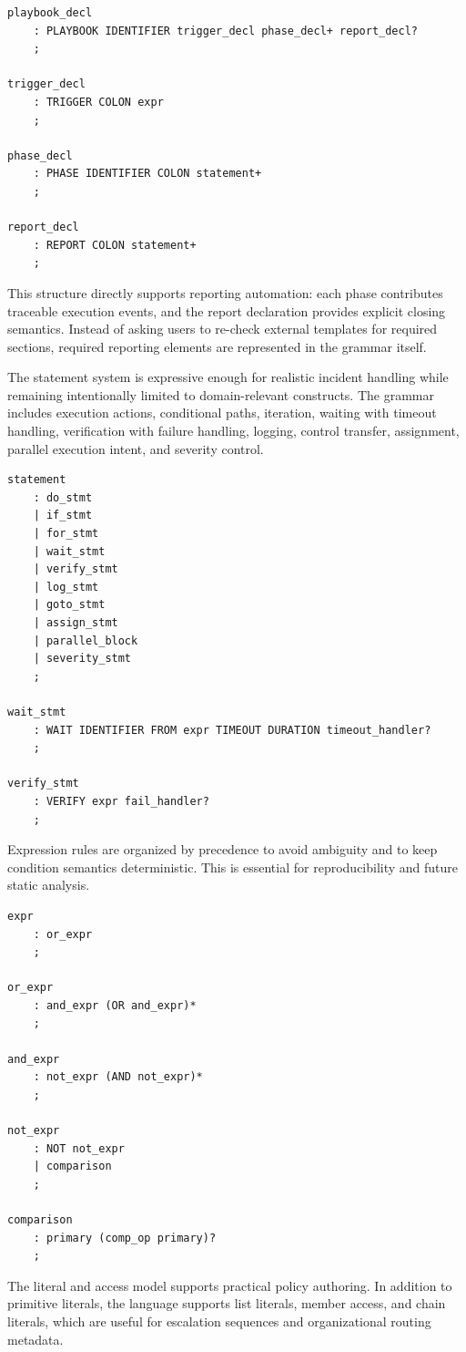 \begin{lstlisting}
playbook_decl
    : PLAYBOOK IDENTIFIER trigger_decl phase_decl+ report_decl?
    ;

trigger_decl
    : TRIGGER COLON expr
    ;

phase_decl
    : PHASE IDENTIFIER COLON statement+
    ;

report_decl
    : REPORT COLON statement+
    ;
\end{lstlisting}

This structure directly supports reporting automation: each phase contributes traceable execution events, and the report declaration provides explicit closing semantics. Instead of asking users to re-check external templates for required sections, required reporting elements are represented in the grammar itself.

The statement system is expressive enough for realistic incident handling while remaining intentionally limited to domain-relevant constructs. The grammar includes execution actions, conditional paths, iteration, waiting with timeout handling, verification with failure handling, logging, control transfer, assignment, parallel execution intent, and severity control.

\begin{lstlisting}
statement
    : do_stmt
    | if_stmt
    | for_stmt
    | wait_stmt
    | verify_stmt
    | log_stmt
    | goto_stmt
    | assign_stmt
    | parallel_block
    | severity_stmt
    ;

wait_stmt
    : WAIT IDENTIFIER FROM expr TIMEOUT DURATION timeout_handler?
    ;

verify_stmt
    : VERIFY expr fail_handler?
    ;
\end{lstlisting}

Expression rules are organized by precedence to avoid ambiguity and to keep condition semantics deterministic. This is essential for reproducibility and future static analysis.

\begin{lstlisting}
expr
    : or_expr
    ;

or_expr
    : and_expr (OR and_expr)*
    ;

and_expr
    : not_expr (AND not_expr)*
    ;

not_expr
    : NOT not_expr
    | comparison
    ;

comparison
    : primary (comp_op primary)?
    ;
\end{lstlisting}

The literal and access model supports practical policy authoring. In addition to primitive literals, the language supports list literals, member access, and chain literals, which are useful for escalation sequences and organizational routing metadata.

